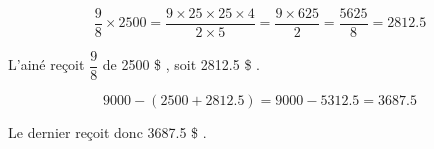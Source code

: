 \documentclass[12pt,a4paper]{article}
\begin{document}
  
  \vspace*{1cm}
  \begin{equation*}
		\dfrac{9}{8} \times 2500 = \dfrac{9 \times 25 \times 25 \times 4 }{2 \times 5} = \dfrac{9 \times 625}{2} = \dfrac{5625}{8} = \num{2812.5}
  \end{equation*}
  
  L'ainé reçoit $\dfrac{9}{8}$ de 2500 \$ , soit \num{2812.5} \$ .
  

  \vspace*{1cm}
    
  \begin{equation*}
  	\num{9000} - (\num{2500} + \num{2812.5}) = 9000 - \num{5312.5} = \num{3687.5}
  \end{equation*}
  
  Le dernier reçoit donc \num{3687.5} \$ .
\end{document}
